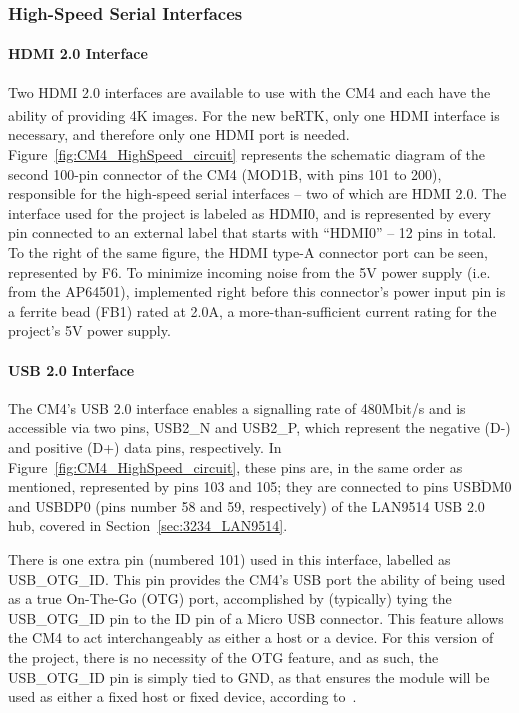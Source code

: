 
\subsubsection{High-Speed Serial Interfaces}\label{sec:3221_CM4_HSpeed}

\paragraph{HDMI 2.0 Interface}	Two HDMI 2.0 interfaces are available to use with the CM4 and each have the ability of providing 4K images. For the new beRTK\textsuperscript{\textregistered}, only one HDMI interface is necessary, and therefore only one HDMI port is needed. Figure~\ref{fig:CM4_HighSpeed_circuit} represents the schematic diagram of the second 100-pin connector of the CM4 (MOD1B, with pins 101 to 200), responsible for the high-speed serial interfaces -- two of which are HDMI 2.0. The interface used for the project is labeled as HDMI0, and is represented by every pin connected to an external label that starts with ``HDMI0'' -- 12 pins in total. To the right of the same figure, the HDMI type-A connector port can be seen, represented by F6. To minimize incoming noise from the 5V power supply (i.e. from the AP64501), implemented right before this connector's power input pin is a ferrite bead (FB1) rated at 2.0A, a more-than-sufficient current rating for the project's 5V power supply.

\paragraph{USB 2.0 Interface}	The CM4's USB 2.0 interface enables a signalling rate of 480Mbit/s and is accessible via two pins, USB2\_N and USB2\_P, which represent the negative (D-) and positive (D+) data pins, respectively. In Figure~\ref{fig:CM4_HighSpeed_circuit}, these pins are, in the same order as mentioned, represented by pins 103 and 105; they are connected to pins $\overline{\mbox{USBDM0}}$ and USBDP0 (pins number 58 and 59, respectively) of the LAN9514 USB 2.0 hub, covered in Section~\ref{sec:3234_LAN9514}.

There is one extra pin (numbered 101) used in this interface, labelled as USB\_OTG\_ID. This pin  provides the CM4's USB port the ability of being used as a true On-The-Go (OTG) port, accomplished by (typically) tying the USB\_OTG\_ID pin to the ID pin of a Micro USB connector. This feature allows the CM4 to act interchangeably as either a host or a device. For this version of the project, there is no necessity of the OTG feature, and as such, the USB\_OTG\_ID pin is simply tied to GND, as that ensures the module will be used as either a fixed host or fixed device, according to~\cite{CM4}.

